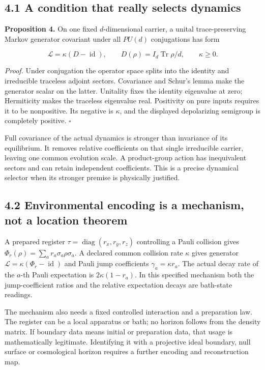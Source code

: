 \documentclass[
  11pt,
  a4paper,
]{article}
\begin{document}
\subsection{4.1 A condition that really selects dynamics}\label{a-condition-that-really-selects-dynamics}

\textbf{Proposition 4.} On one fixed \(d\)-dimensional carrier, a unital trace-preserving Markov generator covariant under all \(PU(d)\) conjugations has form

\[\mathcal L=\kappa(D-\operatorname{id}),\qquad
D(\rho)=I_d\operatorname{Tr}\rho/d,\qquad\kappa\ge0.\]

\emph{Proof.} Under conjugation the operator space splits into the identity and irreducible traceless adjoint sectors. Covariance and Schur's lemma make the generator scalar on the latter. Unitality fixes the identity eigenvalue at zero; Hermiticity makes the traceless eigenvalue real. Positivity on pure inputs requires it to be nonpositive. Its negative is \(\kappa\), and the displayed depolarizing semigroup is completely positive. \(\square\)

Full covariance of the actual dynamics is stronger than invariance of its equilibrium. It removes relative coefficients on that single irreducible carrier, leaving one common evolution scale. A product-group action has inequivalent sectors and can retain independent coefficients. This is a precise dynamical selector when its stronger premise is physically justified.

\subsection{4.2 Environmental encoding is a mechanism, not a location theorem}\label{environmental-encoding-is-a-mechanism-not-a-location-theorem}

A prepared register \(\tau=\operatorname{diag}(r_x,r_y,r_z)\) controlling a Pauli collision gives \(\Phi_r(\rho)=\sum_a r_a\sigma_a\rho\sigma_a\). A declared common collision rate \(\kappa\) gives generator \(\mathcal L=\kappa(\Phi_r-\operatorname{id})\) and Pauli jump coefficients \(\gamma_a=\kappa r_a\). The actual decay rate of the \(a\)-th Pauli expectation is \(2\kappa(1-r_a)\). In this specified mechanism both the jump-coefficient ratios and the relative expectation decays are bath-state readings.

The mechanism also needs a fixed controlled interaction and a preparation law. The register can be a local apparatus or bath; no horizon follows from the density matrix. If boundary data means initial or preparation data, that usage is mathematically legitimate. Identifying it with a projective ideal boundary, null surface or cosmological horizon requires a further encoding and reconstruction map.
\end{document}
